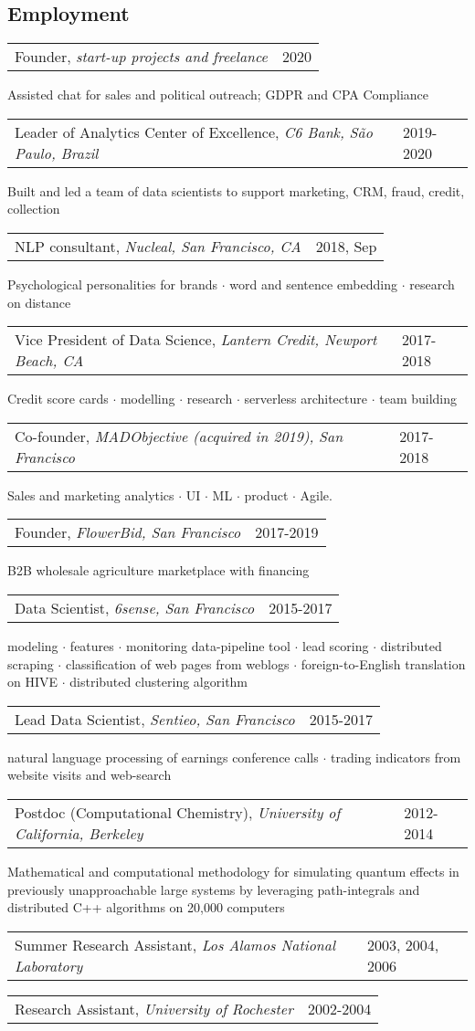 \documentclass{res}
\makeatletter
\newcommand{\af}[3]{
\begin{tabular*}{\textwidth}[t]{@{}p{5.2in} l} 
    #1, \textit{#2} & #3\\
  \end{tabular*}
}
\newcommand{\aff}[4]{
\begin{tabular*}{\textwidth}[t]{@{}p{5.2in} l} 
    #1, \textit{#2} & #3\\
  \end{tabular*}
  {\color[RGB]{106,106,106} #4}\\
}
\makeatother
\begin{document}
 


\address{
  1632 Walnut St.\\
  Berkeley, CA 94709 \\
}
\address{
  (585) 313-6024\\
  kirill.igum@gmail.com\\
  \url{www.linkedin.com/in/kirilligum}
}

\begin{resume}

\section{Employment}
\aff{
Founder}{start-up projects and freelance}{2020}{ 
	Assisted chat for sales and political outreach; GDPR and CPA Compliance
}
\aff{
Leader of Analytics Center of Excellence}{C6 Bank, S\~{a}o Paulo, Brazil}{2019-2020}{ 
	Built and led a team of data scientists to support marketing, CRM, fraud, credit, collection
}
\aff{NLP consultant}{Nucleal, San Francisco, CA}{2018, Sep}{ 
	Psychological personalities for brands $\cdot$ word and sentence embedding $\cdot$ research on distance
}
\aff{Vice President of Data Science}{Lantern Credit, Newport Beach, CA}{2017-2018}{ 
	Credit score cards $\cdot$ modelling $\cdot$ research $\cdot$ serverless architecture $\cdot$ team building
} 
\aff{Co-founder}{MADObjective (acquired in 2019), San Francisco}{2017-2018}{ 
	Sales and marketing analytics $\cdot$ UI $\cdot$ ML $\cdot$ product $\cdot$ Agile.
} 
\aff{Founder}{FlowerBid, San Francisco}{2017-2019}{ 
	B2B wholesale agriculture marketplace with financing 
} 
\aff{Data Scientist}{6sense, San Francisco}{2015-2017}{ 
	modeling $\cdot$ 
	features $\cdot$  
	monitoring data-pipeline tool $\cdot$ 
	lead scoring $\cdot$
	distributed scraping $\cdot$
	classification of web pages from weblogs $\cdot$
	foreign-to-English translation on HIVE $\cdot$
	distributed clustering algorithm
} 
\aff{Lead Data Scientist}{Sentieo, San Francisco}{2015-2017}{ 
	natural language processing of earnings conference calls $\cdot$ trading indicators from website visits and web-search
} 
\aff{Postdoc (Computational Chemistry)}{University of California, Berkeley}{2012-2014}{ 
  Mathematical and computational methodology for simulating quantum effects in previously unapproachable large systems by leveraging path-integrals and distributed C++ algorithms on 20,000 computers
} 
\af{Summer Research Assistant}{Los Alamos National Laboratory}{2003, 2004, 2006}
\af{Research Assistant}{University of Rochester}{2002-2004}
 

\end{resume}
\end{document}
